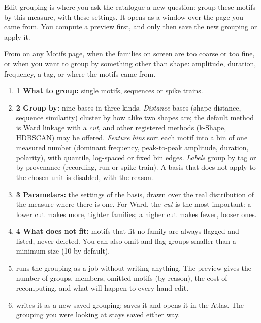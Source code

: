 Edit grouping is where you ask the catalogue a new question: group these motifs by this
measure, with these settings. It opens as a window over the page you came from. You compute
a preview first, and only then save the new grouping or apply it.

From  on any Motifs page, when the families on screen are too coarse or too
fine, or when you want to group by something other than shape: amplitude, duration,
frequency, a tag, or where the motifs came from.


\begin{enumerate}
  \item \textbf{1 What to group:} single motifs, sequences or spike trains.
  \item \textbf{2 Group by:} nine bases in three kinds. \emph{Distance} bases (shape
    distance, sequence similarity) cluster by how alike two shapes are; the default method
    is Ward linkage with a \emph{cut}, and other registered methods (k-Shape, HDBSCAN) may be
    offered. \emph{Feature bins} sort each motif into a bin of one measured number (dominant
    frequency, peak-to-peak amplitude, duration, polarity), with quantile, log-spaced or fixed
    bin edges. \emph{Labels} group by tag or by provenance (recording, run or spike train). A
    basis that does not apply to the chosen unit is disabled, with the reason.
  \item \textbf{3 Parameters:} the settings of the basis, drawn over the real distribution of
    the measure where there is one. For Ward, the \emph{cut} is the most important: a lower
    cut makes more, tighter families; a higher cut makes fewer, looser ones.
  \item \textbf{4 What does not fit:} motifs that fit no family are always flagged and listed,
    never deleted. You can also omit and flag groups smaller than a minimum size (10 by
    default).
  \item {} runs the grouping as a job without writing anything. The preview
    gives the number of groups, members, omitted motifs (by reason), the cost of recomputing,
    and what will happen to every hand edit.
  \item {} writes it as a new saved grouping;  saves
    it and opens it in the Atlas. The grouping you were looking at stays saved either way.
\end{enumerate}

